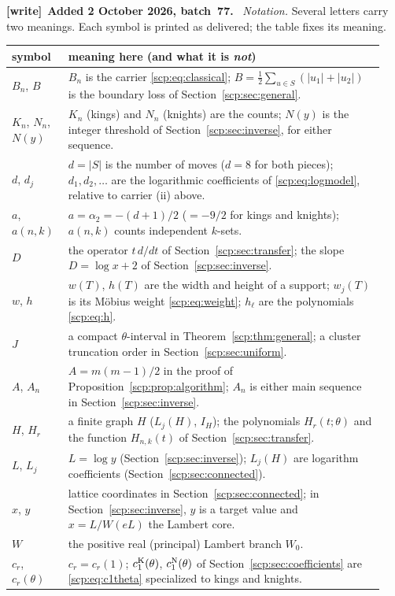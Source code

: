 \documentclass[11pt]{article}
\newenvironment{writenote}[1][]{\par\smallskip\begingroup\small
 \noindent\textbf{[write]}\if\relax\detokenize{#1}\relax\else~\textbf{#1.}\fi\ }%
 {\par\endgroup\smallskip}
\begin{document}
\begin{writenote}[Added 2 October 2026, batch~77]
\emph{Notation.} Several letters carry two meanings. Each symbol is printed
as delivered; the table fixes its meaning.
\begin{center}\footnotesize
\begin{tabular}{@{}p{0.14\linewidth}p{0.80\linewidth}@{}}
\toprule
symbol & meaning here (and what it is \emph{not})\\
\midrule
$B_n$, $B$ & $B_n$ is the carrier \eqref{scp:eq:classical}; $B=\frac12\sum_{u\in S}(|u_1|+|u_2|)$ is the boundary loss of Section~\ref{scp:sec:general}.\\
$K_n$, $N_n$, $N(y)$ & $K_n$ (kings) and $N_n$ (knights) are the counts; $N(y)$ is the integer threshold of Section~\ref{scp:sec:inverse}, for either sequence.\\
$d$, $d_j$ & $d=|S|$ is the number of moves ($d=8$ for both pieces); $d_1,d_2,\ldots$ are the logarithmic coefficients of \eqref{scp:eq:logmodel}, relative to carrier (ii) above.\\
$a$, $a(n,k)$ & $a=\alpha_2=-(d+1)/2$ ($=-9/2$ for kings and knights); $a(n,k)$ counts independent $k$-sets.\\
$D$ & the operator $t\,d/dt$ of Section~\ref{scp:sec:transfer}; the slope $D=\log x+2$ of Section~\ref{scp:sec:inverse}.\\
$w$, $h$ & $w(T)$, $h(T)$ are the width and height of a support; $w_j(T)$ is its M\"obius weight \eqref{scp:eq:weight}; $h_\ell$ are the polynomials \eqref{scp:eq:h}.\\
$J$ & a compact $\theta$-interval in Theorem~\ref{scp:thm:general}; a cluster truncation order in Section~\ref{scp:sec:uniform}.\\
$A$, $A_n$ & $A=m(m-1)/2$ in the proof of Proposition~\ref{scp:prop:algorithm}; $A_n$ is either main sequence in Section~\ref{scp:sec:inverse}.\\
$H$, $H_r$ & a finite graph $H$ ($L_j(H)$, $I_H$); the polynomials $H_r(t;\theta)$ and the function $H_{n,k}(t)$ of Section~\ref{scp:sec:transfer}.\\
$L$, $L_j$ & $L=\log y$ (Section~\ref{scp:sec:inverse}); $L_j(H)$ are logarithm coefficients (Section~\ref{scp:sec:connected}).\\
$x$, $y$ & lattice coordinates in Section~\ref{scp:sec:connected}; in Section~\ref{scp:sec:inverse}, $y$ is a target value and $x=L/W(eL)$ the Lambert core.\\
$W$ & the positive real (principal) Lambert branch $W_0$.\\
$c_r$, $c_r(\theta)$ & $c_r=c_r(1)$; $c_1^{\rm K}(\theta)$, $c_1^{\rm N}(\theta)$ of Section~\ref{scp:sec:coefficients} are \eqref{scp:eq:c1theta} specialized to kings and knights.\\
\bottomrule
\end{tabular}
\end{center}
\end{writenote}
\end{document}

